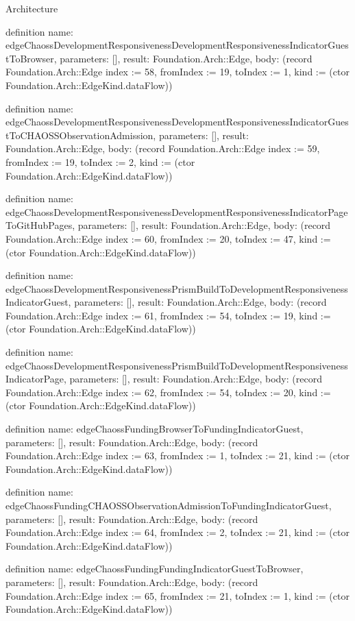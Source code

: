 \begin{lexlean}{Architecture}
\begin{semanticmodule}
definition{
  name: edgeChaossDevelopmentResponsivenessDevelopmentResponsivenessIndicatorGuestToBrowser,
  parameters: [],
  result: Foundation.Arch::Edge,
  body: (record Foundation.Arch::Edge {index := 58, fromIndex := 19, toIndex := 1, kind := (ctor Foundation.Arch::EdgeKind.dataFlow)})
}

definition{
  name: edgeChaossDevelopmentResponsivenessDevelopmentResponsivenessIndicatorGuestToCHAOSSObservationAdmission,
  parameters: [],
  result: Foundation.Arch::Edge,
  body: (record Foundation.Arch::Edge {index := 59, fromIndex := 19, toIndex := 2, kind := (ctor Foundation.Arch::EdgeKind.dataFlow)})
}

definition{
  name: edgeChaossDevelopmentResponsivenessDevelopmentResponsivenessIndicatorPageToGitHubPages,
  parameters: [],
  result: Foundation.Arch::Edge,
  body: (record Foundation.Arch::Edge {index := 60, fromIndex := 20, toIndex := 47, kind := (ctor Foundation.Arch::EdgeKind.dataFlow)})
}

definition{
  name: edgeChaossDevelopmentResponsivenessPrismBuildToDevelopmentResponsivenessIndicatorGuest,
  parameters: [],
  result: Foundation.Arch::Edge,
  body: (record Foundation.Arch::Edge {index := 61, fromIndex := 54, toIndex := 19, kind := (ctor Foundation.Arch::EdgeKind.dataFlow)})
}

definition{
  name: edgeChaossDevelopmentResponsivenessPrismBuildToDevelopmentResponsivenessIndicatorPage,
  parameters: [],
  result: Foundation.Arch::Edge,
  body: (record Foundation.Arch::Edge {index := 62, fromIndex := 54, toIndex := 20, kind := (ctor Foundation.Arch::EdgeKind.dataFlow)})
}

definition{
  name: edgeChaossFundingBrowserToFundingIndicatorGuest,
  parameters: [],
  result: Foundation.Arch::Edge,
  body: (record Foundation.Arch::Edge {index := 63, fromIndex := 1, toIndex := 21, kind := (ctor Foundation.Arch::EdgeKind.dataFlow)})
}

definition{
  name: edgeChaossFundingCHAOSSObservationAdmissionToFundingIndicatorGuest,
  parameters: [],
  result: Foundation.Arch::Edge,
  body: (record Foundation.Arch::Edge {index := 64, fromIndex := 2, toIndex := 21, kind := (ctor Foundation.Arch::EdgeKind.dataFlow)})
}

definition{
  name: edgeChaossFundingFundingIndicatorGuestToBrowser,
  parameters: [],
  result: Foundation.Arch::Edge,
  body: (record Foundation.Arch::Edge {index := 65, fromIndex := 21, toIndex := 1, kind := (ctor Foundation.Arch::EdgeKind.dataFlow)})
}


\end{semanticmodule}
\end{lexlean}

